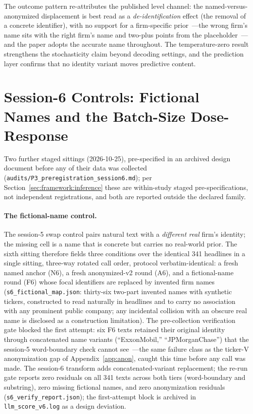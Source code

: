 The outcome pattern re-attributes the published level channel: the named-versus-anonymized displacement is best read as a \emph{de-identification} effect (the removal of a concrete identifier), with no support for a firm-specific prior~---the wrong firm's name sits with the right firm's name and two-plus points from the placeholder~---and the paper adopts the accurate name throughout. The temperature-zero result strengthens the stochasticity claim beyond decoding settings, and the prediction layer confirms that no identity variant moves predictive content.


\section{Session-6 Controls: Fictional Names and the Batch-Size Dose-Response}\label{app:session6}

Two further staged sittings (2026-10-25), pre-specified in an archived design document before any of their data was collected (\texttt{audits/P3\_preregistration\_session6.md}); per Section~\ref{sec:framework:inference} these are within-study staged pre-specifications, not independent registrations, and both are reported outside the declared family.

\paragraph{The fictional-name control.} The session-5 swap control pairs natural text with a \emph{different real} firm's identity; the missing cell is a name that is concrete but carries no real-world prior. The sixth sitting therefore fields three conditions over the identical 341 headlines in a single sitting, three-way rotated call order, protocol verbatim-identical: a fresh named anchor (N6), a fresh anonymized-v2 round (A6), and a fictional-name round (F6) whose focal identifiers are replaced by invented firm names (\texttt{s6\_fictional\_map.json}: thirty-six two-part invented names with synthetic tickers, constructed to read naturally in headlines and to carry no association with any prominent public company; any incidental collision with an obscure real name is disclosed as a construction limitation). The pre-collection verification gate blocked the first attempt: six F6 texts retained their original identity through concatenated name variants (``ExxonMobil,'' ``JPMorganChase'') that the session-5 word-boundary check cannot see~---the same failure class as the ticker-V anonymization gap of Appendix~\ref{app:anon}, caught this time before any call was made. The session-6 transform adds concatenated-variant replacement; the re-run gate reports zero residuals on all 341 texts across both tiers (word-boundary and substring), zero missing fictional names, and zero anonymization residuals (\texttt{s6\_verify\_report.json}); the first-attempt block is archived in \texttt{llm\_score\_v6.log} as a design deviation.

